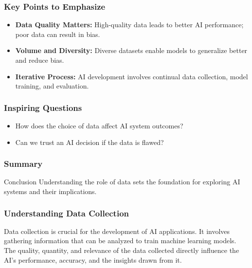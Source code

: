 \documentclass[aspectratio=169]{beamer}
\begin{document}
\begin{frame}[fragile]
    \frametitle{Key Points to Emphasize}
    \begin{itemize}
        \item \textbf{Data Quality Matters:} High-quality data leads to better AI performance; poor data can result in bias.
        \item \textbf{Volume and Diversity:} Diverse datasets enable models to generalize better and reduce bias.
        \item \textbf{Iterative Process:} AI development involves continual data collection, model training, and evaluation.
    \end{itemize}
\end{frame}

\begin{frame}[fragile]
    \frametitle{Inspiring Questions}
    \begin{itemize}
        \item How does the choice of data affect AI system outcomes?
        \item Can we trust an AI decision if the data is flawed?
    \end{itemize}
\end{frame}

\begin{frame}[fragile]
    \frametitle{Summary}
    \begin{block}{Conclusion}
        Understanding the role of data sets the foundation for exploring AI systems and their implications.
    \end{block}
\end{frame}

\begin{frame}[fragile]
    \frametitle{Understanding Data Collection}
    Data collection is crucial for the development of AI applications. It involves gathering information that can be analyzed to train machine learning models. The quality, quantity, and relevance of the data collected directly influence the AI's performance, accuracy, and the insights drawn from it.
\end{frame}
\end{document}
